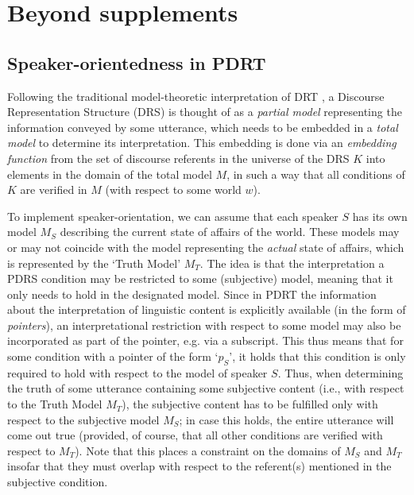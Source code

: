 \section{Beyond supplements}

\subsection{Speaker-orientedness in PDRT}

Following the traditional model-theoretic interpretation of DRT \citep[see,
e.g.]{kamp1981theory,kamp1993discourse,kamp2011discourse}, a Discourse
Representation Structure (DRS) is thought of as a \textit{partial model}
representing the information conveyed by some utterance, which needs to be
embedded in a \textit{total model} to determine its interpretation. This
embedding is done via an \textit{embedding function} from the set of
discourse referents in the universe of the DRS $K$ into elements in the
domain of the total model $M$, in such a way that all conditions of $K$ are
verified in $M$ (with respect to some world $w$).

To implement speaker-orientation, we can assume that each speaker $S$ has
its own model $M_S$ describing the current state of affairs of the world.
These models may or may not coincide with the model representing the
\textit{actual} state of affairs, which is represented by the `Truth Model'
$M_T$. The idea is that the interpretation a PDRS condition may be
restricted to some (subjective) model, meaning that it only needs to hold in
the designated model. Since in PDRT the information about the interpretation
of linguistic content is explicitly available (in the form of
\textit{pointers}), an interpretational restriction with respect to some
model may also be incorporated as part of the pointer, e.g. via a subscript.
This thus means that for some condition with a pointer of the form `$p_S$',
it holds that this condition is only required to hold with respect to the
model of speaker $S$. Thus, when determining the truth of some utterance
containing some subjective content (i.e., with respect to the Truth Model
$M_T$), the subjective content has to be fulfilled only with respect to the
subjective model $M_S$; in case this holds, the entire utterance will come
out true (provided, of course, that all other conditions are verified with
respect to $M_T$). Note that this places a constraint on the domains of
$M_S$ and $M_T$ insofar that they must overlap with respect to the
referent(s) mentioned in the subjective condition.

